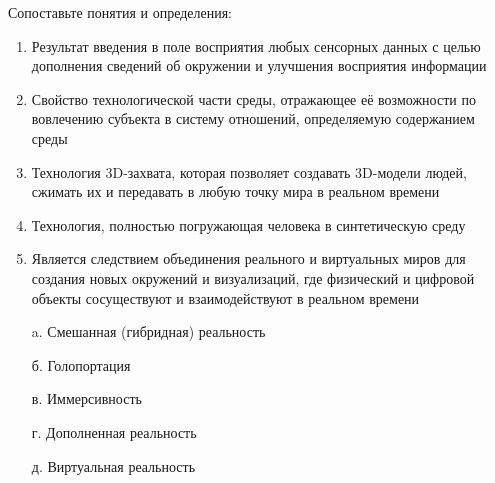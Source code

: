 
Сопоставьте понятия и определения:

        \begin{enumerate}
            \item Результат введения в поле восприятия любых сенсорных данных с целью дополнения сведений об окружении и улучшения восприятия информации
            \item Свойство технологической части среды, отражающее её возможности по вовлечению субъекта в систему отношений, определяемую содержанием среды
            \item Технология 3D-захвата, которая позволяет создавать 3D-модели людей, сжимать их и передавать в любую точку мира в реальном времени
            \item Технология, полностью погружающая человека в синтетическую среду
            \item Является следствием объединения реального и виртуальных миров для создания новых окружений и визуализаций, где физический и цифровой объекты сосуществуют и взаимодействуют в реальном времени
        \end{enumerate}

        \begin{enumerate}
            \item[a.] Смешанная (гибридная) реальность
            \item[б.] Голопортация
            \item[в.] Иммерсивность
            \item[г.] Дополненная реальность
            \item[д.] Виртуальная реальность
        \end{enumerate}